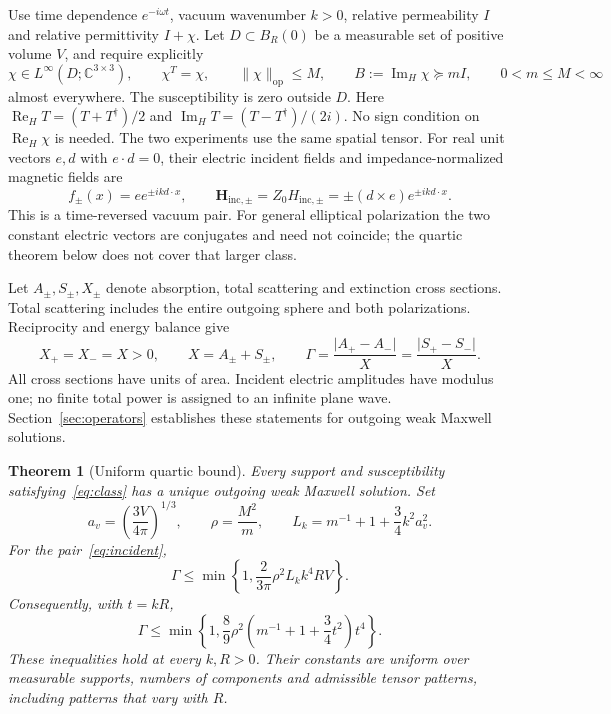 \documentclass[11pt]{article}
\newtheorem{theorem}{Theorem}[section]
\newcommand{\ReH}{\operatorname{Re}_{\!H}}
\newcommand{\ImH}{\operatorname{Im}_{\!H}}
\newcommand{\norm}[1]{\lVert #1\rVert}
\newcommand{\abs}[1]{\lvert #1\rvert}
\begin{document}
Use time dependence $e^{-i\omega t}$, vacuum wavenumber $k>0$, relative permeability $I$ and relative permittivity $I+\chi$. Let $D\subset B_R(0)$ be a measurable set of positive volume $V$, and require explicitly
\begin{equation}\label{eq:class}
 \chi\in L^\infty(D;\mathbb C^{3\times3}),\qquad
 \chi^T=\chi,\qquad \norm{\chi}_{\mathrm{op}}\leq M,
 \qquad B:=\ImH\chi\succeq mI,
 \qquad 0<m\leq M<\infty
\end{equation}
almost everywhere. The susceptibility is zero outside $D$. Here $\ReH T=(T+T^\dagger)/2$ and $\ImH T=(T-T^\dagger)/(2i)$. No sign condition on $\ReH\chi$ is needed. The two experiments use the same spatial tensor. For real unit vectors $e,d$ with $e\cdot d=0$, their electric incident fields and impedance-normalized magnetic fields are
\begin{equation}\label{eq:incident}
 f_\pm(x)=e e^{\pm ikd\cdot x},\qquad
 \mathbf H_{\mathrm{inc},\pm}=Z_0H_{\mathrm{inc},\pm}
   =\pm(d\times e)e^{\pm ikd\cdot x}.
\end{equation}
This is a time-reversed vacuum pair. For general elliptical polarization the two constant electric vectors are conjugates and need not coincide; the quartic theorem below does not cover that larger class.

Let $A_\pm,S_\pm,X_\pm$ denote absorption, total scattering and extinction cross sections. Total scattering includes the entire outgoing sphere and both polarizations. Reciprocity and energy balance give
\begin{equation}\label{eq:gamma}
 X_+=X_-=X>0,\qquad X=A_\pm+S_\pm,\qquad
 \Gamma=\frac{\abs{A_+-A_-}}{X}
       =\frac{\abs{S_+-S_-}}{X}.
\end{equation}
All cross sections have units of area. Incident electric amplitudes have modulus one; no finite total power is assigned to an infinite plane wave. Section~\ref{sec:operators} establishes these statements for outgoing weak Maxwell solutions.

\begin{theorem}[Uniform quartic bound]\label{thm:upper}
Every support and susceptibility satisfying~\eqref{eq:class} has a unique outgoing weak Maxwell solution. Set
\begin{equation}\label{eq:constants}
 a_v=\left(\frac{3V}{4\pi}\right)^{1/3},\qquad
 \rho=\frac{M^2}{m},\qquad
 L_k=m^{-1}+1+\frac34 k^2a_v^2.
\end{equation}
For the pair~\eqref{eq:incident},
\begin{equation}\label{eq:upper}
 \Gamma\leq\min\left\{1,\frac{2}{3\pi}\rho^2L_k k^4RV\right\}.
\end{equation}
Consequently, with $t=kR$,
\begin{equation}\label{eq:ball-upper}
 \Gamma\leq\min\left\{1,
 \frac89\rho^2\left(m^{-1}+1+\frac34t^2\right)t^4\right\}.
\end{equation}
These inequalities hold at every $k,R>0$. Their constants are uniform over measurable supports, numbers of components and admissible tensor patterns, including patterns that vary with $R$.
\end{theorem}
\end{document}
